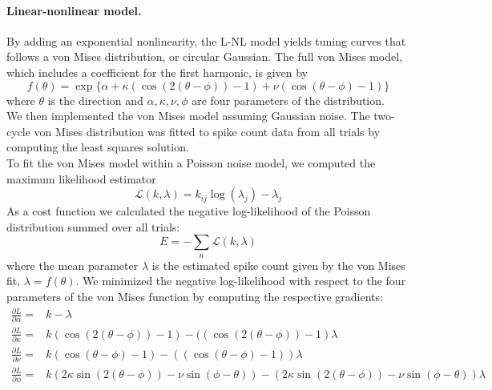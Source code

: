 \documentclass[10pt]{article}
\begin{document}
\paragraph{Linear-nonlinear model.} By adding an exponential nonlinearity, the L-NL model yields tuning curves that follows a von Mises distribution, or circular Gaussian. The full von Mises model, which includes a coefficient for the first harmonic, is given by
\begin{equation*}
f(\theta) = \exp\{ \alpha+\kappa(\cos(2(\theta-\phi))-1)+\nu(\cos(\theta-\phi)-1)\}
\end{equation*}
where $\theta$ is the direction and  $\alpha, \kappa, \nu, \phi$ are four parameters of the distribution. \\

We then implemented the von Mises model assuming Gaussian noise. The two-cycle von Mises distribution was fitted to spike count data from all trials by computing the least squares solution. \\
To fit the von Mises model within a Poisson noise model, we computed the maximum likelihood estimator
\begin{equation*}
\mathcal{L}(k,\lambda) = k_{ij}\log(\lambda_j)-\lambda_j
\end{equation*}
As a cost function we calculated the negative log-likelihood of the Poisson distribution summed over all trials: 
\begin{equation}
E = - \sum_n \mathcal{L}(k,\lambda)
\end{equation}
where the mean parameter $\lambda$ is the estimated spike count given by the von Mises fit, $\lambda = f(\theta)$. We minimized the negative log-likelihood with respect to the four parameters of the von Mises function by computing the respective gradients:
\begin{align*}
 \frac{\partial L}{\partial \alpha} = &k - \lambda  \\
 \frac{\partial L}{\partial \kappa} = &k(\cos(2(\theta-\phi))-1) - ((\cos(2(\theta-\phi))-1) \lambda \\
 \frac{\partial L}{\partial \nu} = &k(\cos(\theta-\phi)-1) - ((\cos(\theta-\phi)-1)) \lambda \\
 \frac{\partial L}{\partial \phi} =  & k(2\kappa \sin(2(\theta-\phi)) - \nu \sin(\phi-\theta)) -(2\kappa \sin(2(\theta-\phi))- \nu \sin(\phi-\theta)) \lambda
\end{align*}
\end{document}
